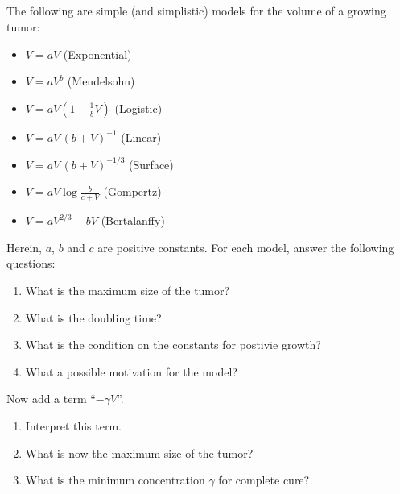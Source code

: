 \documentclass[12pt,a4paper]{article}
\begin{document}
    
    \subsection{}
    
    The following are simple (and simplistic) models for 
    the volume of a growing tumor:
    \begin{itemize}
    \item 
        $\dot{V} = a V$
        \hfill
        (Exponential)
    \item
        $\dot{V} = a V^b$
        \hfill
        (Mendelsohn)
    \item
        $\dot{V} = a V (1 - \frac1b V)$
        \hfill
        (Logistic)
    \item
        $\dot{V} = a V \, (b + V)^{-1}$
        \hfill
        (Linear)
    \item
        $\dot{V} = a V \, (b + V)^{-1/3}$
        \hfill
        (Surface)
    \item
        $\dot{V} = a V \log \frac{b}{c + V}$
        \hfill
        (Gompertz)
    \item
        $\dot{V} = a V^{2/3} - b V$
        \hfill
        (Bertalanffy)
    \end{itemize}
    Herein, $a$, $b$ and $c$ are positive constants.
    For each model, answer the following questions:
    \begin{enumerate}
    \item 
        What is the maximum size of the tumor?
    \item
        What is the doubling time?
    \item
        What is the condition on the constants for postivie growth?
    \item
        What a possible motivation for the model?
    \end{enumerate}
    
    
    Now add a term ``$-\gamma V$''.
    \begin{enumerate}[resume]
    \item
        Interpret this term.
    \item
        What is now the maximum size of the tumor?
    \item
        What is the minimum concentration $\gamma$ for complete cure?
    \end{enumerate}
    
\end{document}
